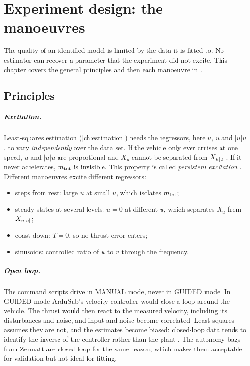 \chapter{Experiment design: the manoeuvres}
\label{ch:maneuvers}

The quality of an identified model is limited by the data it is fitted to. No estimator can
recover a parameter that the experiment did not excite. This chapter covers the general
principles and then each manoeuvre in .

\section{Principles}

\paragraph{Excitation.} Least-squares estimation (\cref{ch:estimation}) needs the regressors, here
$\dot u$, $u$ and $|u|u$, to vary \emph{independently} over the data set. If the vehicle only
ever cruises at one speed, $u$ and $|u|u$ are proportional and $X_u$ cannot be separated
from $X_{u|u|}$. If it never accelerates, $m_\mathrm{tot}$ is invisible. This property is called
\emph{persistent excitation} \cite{ljung1999}. Different manoeuvres excite different
regressors:
\begin{itemize}[nosep]
  \item steps from rest: large $\dot u$ at small $u$, which isolates $m_\mathrm{tot}$;
  \item steady states at several levels: $\dot u = 0$ at different $u$, which separates $X_u$ from $X_{u|u|}$;
  \item coast-down: $T = 0$, so no thrust error enters;
  \item sinusoids: controlled ratio of $\dot u$ to $u$ through the frequency.
\end{itemize}

\paragraph{Open loop.} The command scripts drive  in
MANUAL mode, never  in GUIDED mode. In GUIDED mode ArduSub's velocity
controller would close a loop around the vehicle. The thrust would then react to the
measured velocity, including its disturbances and noise, and input and noise become
correlated. Least squares assumes they are not, and the estimates become biased: closed-loop
data tends to identify the inverse of the controller rather than the plant
\cite[ch.~13]{ljung1999}. The autonomy bags from Zermatt are closed loop for the same reason,
which makes them acceptable for validation but not ideal for fitting.

